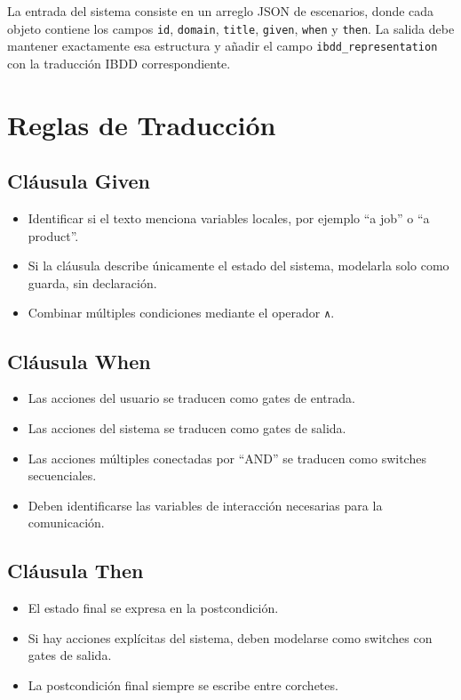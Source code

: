 La entrada del sistema consiste en un arreglo JSON de escenarios, donde cada objeto contiene los campos \texttt{id}, \texttt{domain}, \texttt{title}, \texttt{given}, \texttt{when} y \texttt{then}. La salida debe mantener exactamente esa estructura y añadir el campo \texttt{ibdd\_representation} con la traducción IBDD correspondiente.

\section{Reglas de Traducción}

\subsection{Cláusula Given}

\begin{itemize}
\item Identificar si el texto menciona variables locales, por ejemplo ``a job'' o ``a product''.
\item Si la cláusula describe únicamente el estado del sistema, modelarla solo como guarda, sin declaración.
\item Combinar múltiples condiciones mediante el operador \texttt{∧}.
\end{itemize}

\subsection{Cláusula When}

\begin{itemize}
\item Las acciones del usuario se traducen como gates de entrada.
\item Las acciones del sistema se traducen como gates de salida.
\item Las acciones múltiples conectadas por ``AND'' se traducen como switches secuenciales.
\item Deben identificarse las variables de interacción necesarias para la comunicación.
\end{itemize}

\subsection{Cláusula Then}

\begin{itemize}
\item El estado final se expresa en la postcondición.
\item Si hay acciones explícitas del sistema, deben modelarse como switches con gates de salida.
\item La postcondición final siempre se escribe entre corchetes.
\end{itemize}


